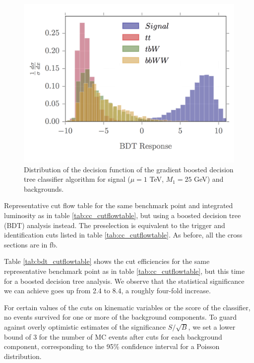\documentclass[a4paper,11pt]{article}
\begin{document}
\begin{figure}[h]
\centering
\includegraphics[trim = {0 0.5cm 0 0},clip]{images/bdt_response_png}
\caption{Distribution of the decision function of the gradient boosted decision
tree classifier algorithm for signal ($\mu = 1$ TeV, $M_1 = 25$ GeV) and
backgrounds. }
\label{fig:bdt_response}
\end{figure}

\begin{table}[h]
  \centering
  
  \caption{Representative cut flow table for the same benchmark point and
    integrated luminosity as in table \ref{tab:cc_cutflowtable}, but using a
    boosted decision tree (BDT) analysis instead. The preselection is equivalent
    to the trigger and identification cuts listed in table
    \ref{tab:cc_cutflowtable}. As before, all the cross sections are in
  fb.  }
\label{tab:bdt_cutflowtable}
\end{table}

Table \ref{tab:bdt_cutflowtable} shows the cut efficiencies for the same
representative benchmark point as in table \ref{tab:cc_cutflowtable}, but this
time for a boosted decision tree analysis. We observe that the statistical
significance we can achieve goes up from 2.4 to 8.4, a roughly four-fold
increase.  

For certain values of the
cuts on kinematic variables or the score of the classifier, no events survived
for one or more of the background components. To guard against overly optimistic
estimates of the significance $S/\sqrt{B}$, we set a lower bound of 3 for the
number of MC events after cuts for each background component, corresponding to
the 95\% confidence interval for a Poisson distribution. 
\end{document}
